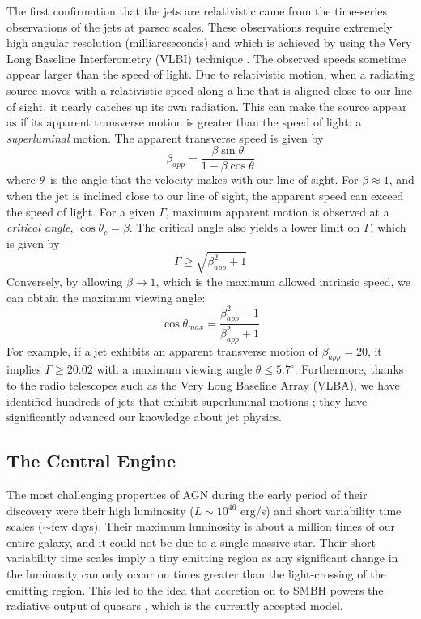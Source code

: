 The first confirmation that the jets are relativistic came from the time-series observations of the jets at parsec scales. These observations require extremely high angular resolution (milliarcseconds) and which is achieved by using the Very Long Baseline Interferometry (VLBI) technique \citep{cohen1971small}. The observed speeds sometime appear larger than the speed of light. Due to relativistic motion, when a radiating source moves with a relativistic speed along a line that is aligned close to our line of sight, it nearly catches up its own radiation. This can make the source appear as if its apparent transverse motion is greater than the speed of light: a \textit{superluminal} motion. The apparent transverse speed is given by
\begin{equation}
    \beta_{app}=\frac{\beta\sin{\theta}}{1-\beta\cos{\theta}}
\end{equation}
where $\theta$~is the angle that the velocity makes with our line of sight.
For $\beta\approx1$, and when the jet is inclined close to our line of sight, the apparent speed can exceed the speed of light. For a given $\Gamma$, maximum apparent motion is observed at a \textit{critical angle}, $\cos{\theta_c}=\beta$. The critical angle also yields a lower limit on $\Gamma$, which is given by
\begin{equation}
    \Gamma\geq\sqrt{\beta_{app}^2+1}
\end{equation}
Conversely, by allowing $\beta\to1$, which is the maximum allowed intrinsic speed, we can obtain the maximum viewing angle:
\begin{equation}
    \cos{\theta_{max}}=\frac{\beta_{app}^2-1}{\beta_{app}^2+1}
\end{equation}
For example, if a jet exhibits an apparent transverse motion of $\beta_{app}=20$, it implies $\Gamma\geq20.02$ with a maximum viewing angle $\theta\leq5.7^\circ$.
Furthermore, thanks to the radio telescopes such as the Very Long Baseline Array (VLBA), we have identified hundreds of jets that exhibit superluminal motions \citep[e.g.,][]{2018ApJS..234...12L}; they have significantly advanced our knowledge about jet physics.
\subsection{The Central Engine \label{sec:engine}}
The most challenging properties of AGN during the early period  of their discovery were their
high luminosity ($L\sim10^{46}$ erg/s) and short variability time scales ($\sim$few days). Their maximum luminosity is about a million times of our entire galaxy, and it could not be due to a single massive star. Their short variability time scales imply a tiny emitting region as any significant change in the luminosity can only occur on times greater than the light-crossing of the emitting region. This led to the idea that accretion on to SMBH powers the radiative output of quasars \citep{salpeter1964accretion,zel1964estimating,lynden1969galactic}, which is the currently accepted model.

